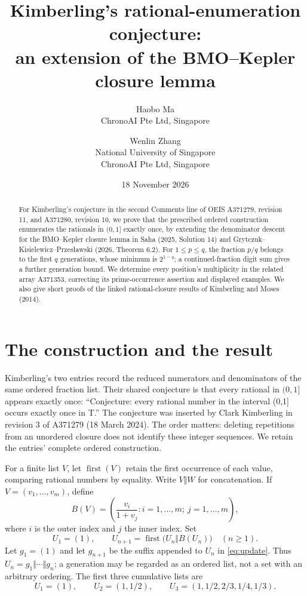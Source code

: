 \documentclass[11pt]{article}
\title{Kimberling's rational-enumeration conjecture:\\an extension of the BMO--Kepler closure lemma}
\author{Haobo Ma\\\small ChronoAI Pte Ltd, Singapore
\and Wenlin Zhang\\\small National University of Singapore\\\small ChronoAI Pte Ltd, Singapore}
\date{18 November 2026}
\begin{document}
\maketitle
\begin{abstract}
For Kimberling's conjecture in the second Comments line of OEIS A371279,
revision 11, and A371280, revision 10, we prove that the prescribed ordered
construction enumerates the rationals in $(0,1]$ exactly once, by extending
the denominator descent for the BMO--Kepler closure lemma in Saha
(2025, Solution 14) and Grytczuk--Kisielewicz--Przes{\l}awski
(2026, Theorem 6.2). For $1\le p\le q$, the fraction $p/q$ belongs
to the first $q$ generations, whose minimum is $2^{1-q}$; a continued-fraction
digit sum gives a further generation bound.
We determine every position's multiplicity in the related array A371353,
correcting its prime-occurrence assertion and displayed examples.
We also give short proofs of the linked rational-closure results of
Kimberling and Moses (2014).
\end{abstract}

\section{The construction and the result}
Kimberling's two entries \cite{num,den} record the reduced numerators and
denominators of the same ordered fraction list. Their shared conjecture is
that every rational in $(0,1]$ appears exactly once:
``Conjecture: every rational number in the interval (0,1] occurs exactly once in T.''
The conjecture was inserted by Clark Kimberling in revision 3 of A371279
(18 March 2024). The order matters:
deleting repetitions from an unordered closure does not identify these
integer sequences. We retain the entries' complete ordered construction.

For a finite list $V$, let $\operatorname{first}(V)$ retain the first
occurrence of each value, comparing rational numbers by equality. Write
$V\Vert W$ for concatenation. If $V=(v_1,\ldots,v_m)$, define
\[
 B(V)=\left(\frac{v_i}{1+v_j}:i=1,\ldots,m;\ j=1,\ldots,m\right),
\]
where $i$ is the outer index and $j$ the inner index. Set
\begin{equation}\label{eq:update}
 U_1=(1),\qquad U_{n+1}=\operatorname{first}\bigl(U_n\Vert B(U_n)\bigr)
 \quad(n\ge1).
\end{equation}
Let $g_1=(1)$ and let $g_{n+1}$ be the suffix appended to $U_n$ in
\eqref{eq:update}. Thus $U_n=g_1\Vert\cdots\Vert g_n$; a generation may
be regarded as an ordered list, not a set with an arbitrary ordering.
The first three cumulative lists are
\[
 U_1=(1),\qquad U_2=(1,1/2),\qquad
 U_3=(1,1/2,2/3,1/4,1/3).
\]
\end{document}
